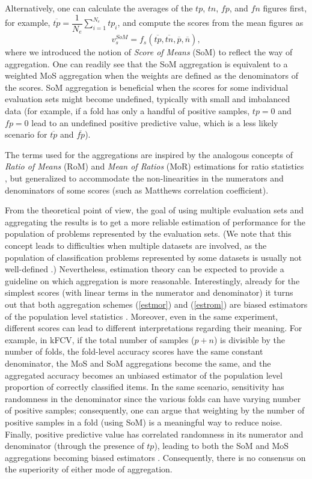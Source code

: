 \documentclass[3p, times]{elsarticle}
\begin{document}
Alternatively, one can calculate the averages of the $tp$, $tn$, $fp$, and $fn$ figures first, for example, $\overline{tp} = \dfrac{1}{N_e}\sum\limits_{i=1}^{N_e} tp_i$, and compute the scores from the mean figures as
\begin{equation}
\label{estrom}
v_s^{SoM} = f_s\left(\overline{tp}, \overline{tn}, \overline{p}, \overline{n}\right),
\end{equation}
where we introduced the notion of \emph{Score of Means} (SoM) to reflect the way of aggregation. One can readily see that the SoM aggregation is equivalent to a weighted MoS aggregation when the weights are defined as the denominators of the scores. SoM aggregation is beneficial when the scores for some individual evaluation sets might become undefined, typically with small and imbalanced data \cite{romex0} (for example, if a fold has only a handful of positive samples, $tp=0$ and $fp=0$ lead to an undefined positive predictive value, which is a less likely scenario for $\overline{tp}$ and $\overline{fp}$).

The terms used for the aggregations are inspired by the analogous concepts of \emph{Ratio of Means} (RoM) and \emph{Mean of Ratios} (MoR) estimations for ratio statistics \cite{rommor, rommor2}, but generalized to accommodate the non-linearities in the numerators and denominators of some scores (such as Matthews correlation coefficient).

From the theoretical point of view, the goal of using multiple evaluation sets and aggregating the results is to get a more reliable estimation of performance for the population of problems represented by the evaluation sets. (We note that this concept leads to difficulties when multiple datasets are involved, as the population of classification problems represented by some datasets is usually not well-defined \cite{nfl}.) Nevertheless, estimation theory \cite{estimationtheory} can be expected to provide a guideline on which aggregation is more reasonable. Interestingly, already for the simplest scores (with linear terms in the numerator and denominator) it turns out that both aggregation schemes (\ref{estmor}) and (\ref{estrom}) are biased estimators of the population level statistics \cite{rommor2}. Moreover, even in the same experiment, different scores can lead to different interpretations regarding their meaning. For example, in kFCV, if the total number of samples ($p + n$) is divisible by the number of folds, the fold-level accuracy scores have the same constant denominator, the MoS and SoM aggregations become the same, and the aggregated accuracy becomes an unbiased estimator of the population level proportion of correctly classified items. In the same scenario, sensitivity has randomness in the denominator since the various folds can have varying number of positive samples; consequently, one can argue that weighting by the number of positive samples in a fold (using SoM) is a meaningful way to reduce noise. Finally, positive predictive value has correlated randomness in its numerator and denominator (through the presence of $tp$), leading to both the SoM and MoS aggregations becoming biased estimators \cite{rommor2}. Consequently, there is no consensus on the superiority of either mode of aggregation.
\end{document}

